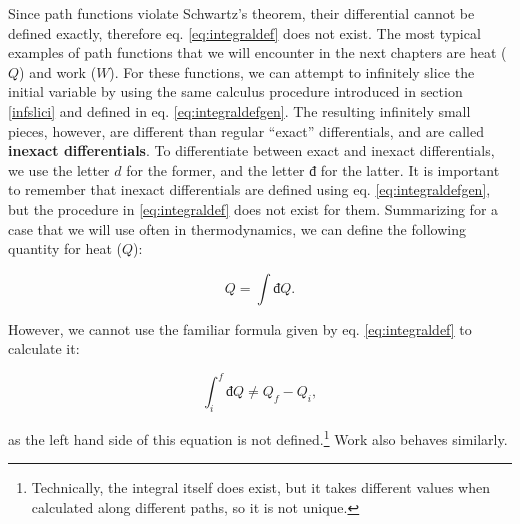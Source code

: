 \documentclass[
  9pt,
]{extbook}
\theoremstyle{definition}
\theoremstyle{definition}
\theoremstyle{definition}
\theoremstyle{remark}
\begin{document}
Since path functions violate Schwartz's theorem, their differential cannot be defined exactly, therefore eq. \eqref{eq:integraldef} does not exist. The most typical examples of path functions that we will encounter in the next chapters are heat (\(Q\)) and work (\(W\)). For these functions, we can attempt to infinitely slice the initial variable by using the same calculus procedure introduced in section \ref{infslici} and defined in eq. \eqref{eq:integraldefgen}. The resulting infinitely small pieces, however, are different than regular ``exact'' differentials, and are called \textbf{inexact differentials}. To differentiate between exact and inexact differentials, we use the letter \(d\) for the former, and the letter \(đ\) for the latter. It is important to remember that inexact differentials are defined using eq. \eqref{eq:integraldefgen}, but the procedure in \eqref{eq:integraldef} does not exist for them. Summarizing for a case that we will use often in thermodynamics, we can define the following quantity for heat (\(Q\)):

\begin{equation}
  Q = \int đQ.   
  \label{eq:intdbarQ}
\end{equation}

However, we cannot use the familiar formula given by eq. \eqref{eq:integraldef} to calculate it:

\begin{equation}
  \int_{i}^{f} đQ \neq Q_f - Q_i,     
  \label{eq:intdbarQfull}
\end{equation}

as the left hand side of this equation is not defined.\footnote{Technically, the integral itself does exist, but it takes different values when calculated along different paths, so it is not unique.} Work also behaves similarly.
\end{document}
